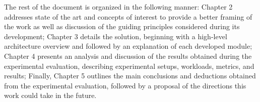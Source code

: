 The rest of the document is organized in the following manner: Chapter 2 addresses state of the art and concepts of interest to provide a better framing of the work as well as discussion of the guiding principles considered during its development; Chapter 3 details the solution, beginning with a high-level architecture overview and followed by an explanation of each developed module; Chapter 4 presents an analysis and discussion of the results obtained during the experimental evaluation, describing experimental setups, workloads, metrics, and results; Finally, Chapter 5 outlines the main conclusions and deductions obtained from the experimental evaluation, followed by a proposal of the directions this work could take in the future.